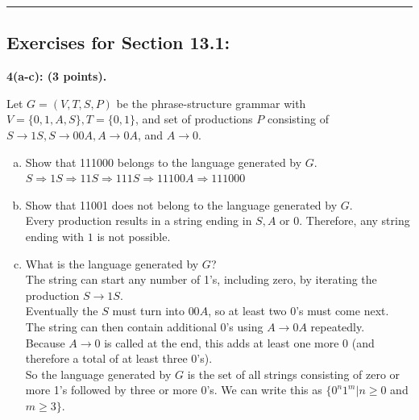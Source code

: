 \documentclass[12pt]{article}  %
\begin{document}
\rule{6in}{.1pt}       %


\subsection*{Exercises for Section 13.1:}     

\noindent
{\bf 4(a-c): (3 points).}

\noindent
Let $G=(V,T,S,P)$ be the phrase-structure grammar with $V=\{0, 1, A, S\},T=\{0, 1\}$, and set of productions $P$ consisting of $S\to1S,S\to00A,A\to0A$, and $A\to0.$
\begin{enumerate}[a)]
    \item Show that 111000 belongs to the language generated by $G$.\\
    $S\Rightarrow1S\Rightarrow11S\Rightarrow111S\Rightarrow11100A\Rightarrow111000$
    \item Show that 11001 does not belong to the language generated by $G$.\\
    Every production results in a string ending in $S,A$ or $0$. Therefore, any string ending with $1$ is not possible.
    \item What is the language generated by $G$?\\
    The string can start any number of 1’s, including zero, by iterating the production $S\to1S$.\\
    Eventually the $S$ must turn into $00A$, so at least two 0’s must come next.\\
    The string can then contain additional 0's using $A\to0A$ repeatedly.\\
    Because $A\to0$ is called at the end, this adds at least one more 0 (and therefore a total of at least three 0’s).\\
    So the language generated by $G$ is the set of all strings consisting of zero or more 1’s followed by three or more 0’s. We can write this as $\{0^n1^m\vert n\geq0$ and $m\geq3 \}$.
    
\end{enumerate}
\end{document}

